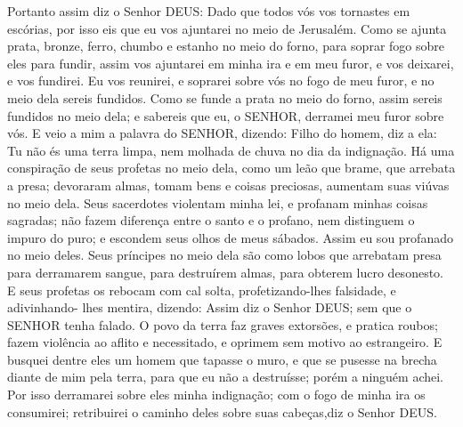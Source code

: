 {  Portanto assim diz o Senhor DEUS: Dado que todos vós vos tornastes em escórias, por isso eis que eu vos ajuntarei no meio de Jerusalém.
  Como se ajunta prata, bronze, ferro, chumbo e estanho no meio do forno, para soprar fogo sobre eles para fundir, assim vos ajuntarei em minha ira e em meu furor, e
{} vos deixarei, e vos fundirei.
  Eu vos reunirei, e soprarei sobre vós no fogo de meu furor, e no meio dela sereis fundidos.
  Como se funde a prata no meio do forno, assim sereis fundidos no meio dela; e sabereis que eu, o SENHOR, derramei meu furor sobre vós.
  E veio a mim a palavra do SENHOR, dizendo:
  Filho do homem, diz a ela: Tu não és uma terra limpa, nem molhada de chuva no dia da indignação.
  Há uma conspiração de seus profetas no meio dela, como um leão que brame, que arrebata a presa; devoraram almas, tomam bens e coisas preciosas, aumentam suas viúvas no meio dela.
  Seus sacerdotes violentam minha lei, e profanam minhas coisas sagradas; não fazem diferença entre o santo e o profano, nem distinguem o impuro do puro; e escondem seus olhos de meus sábados. Assim eu sou profanado no meio deles.
  Seus príncipes no meio dela são como lobos que arrebatam presa para derramarem sangue, para destruírem almas, para obterem lucro desonesto.
  E seus profetas os rebocam com cal solta, profetizando-lhes falsidade, e adivinhando- lhes mentira, dizendo: Assim diz o Senhor DEUS; sem que o SENHOR tenha falado.
  O povo da terra faz graves extorsões, e pratica roubos; fazem violência ao aflito e necessitado, e oprimem sem motivo ao estrangeiro.
  E busquei dentre eles um homem que tapasse o muro, e que se pusesse na brecha diante de mim pela terra, para que eu não a destruísse; porém a ninguém achei.
  Por isso derramarei sobre eles minha indignação; com o fogo de minha ira os consumirei; retribuirei o caminho deles sobre suas
{} cabeças,diz o Senhor DEUS.
\par }

